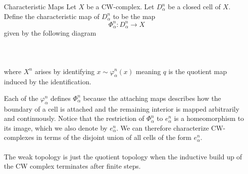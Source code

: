 \documentclass[a4paper]{article}
\begin{document}
\begin{defn}{Characteristic Maps}{} Let $X$ be a CW-complex. Let $D_\alpha^n$ be a closed cell of $X$. Define the characteristic map of $D_\alpha^n$ to be the map $$\Phi_\alpha^n:D_\alpha^n\to X$$ given by the following diagram \\~\\
\\~\\where $X^n$ arises by identifying $x\sim\varphi_\alpha^n(x)$ meaning $q$ is the quotient map induced by the identification. 
\end{defn}

Each of the $\varphi_\alpha^n$ defines $\Phi_\alpha^n$ because the attaching maps describes how the boundary of a cell is attached and the remaining interior is mapped arbitrarily and continuously. Notice that the restriction of $\Phi_\alpha^n$ to $e_\alpha^n$ is a homeomorphism to its image, which we also denote by $e_\alpha^n$. We can therefore characterize CW-complexes in terms of the disjoint union of all cells of the form $e_\alpha^n$. \\~\\

The weak topology is just the quotient topology when the inductive build up of the CW complex terminates after finite steps. 
\end{document}
